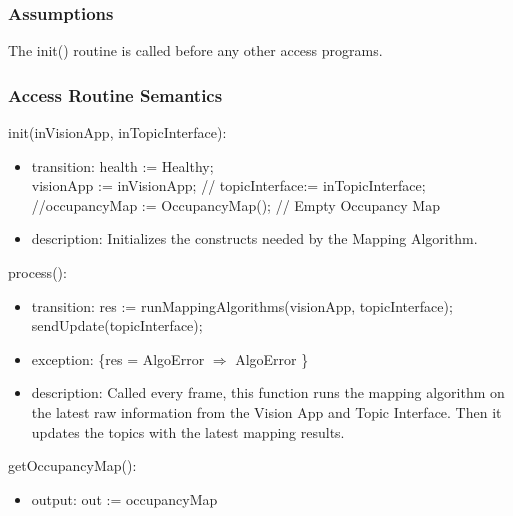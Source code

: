 \documentclass[12pt, titlepage]{article}
\begin{document}
\subsubsection{Assumptions}
The init() routine is called before any other access programs.
\subsubsection{Access Routine Semantics}
\noindent init(inVisionApp, inTopicInterface):
\begin{itemize}
\item transition: health := Healthy; \\ visionApp := inVisionApp; // topicInterface:= inTopicInterface; //occupancyMap := OccupancyMap(); // Empty Occupancy Map \\
\item description: Initializes the constructs needed by the Mapping Algorithm.
\end{itemize}
\noindent process():
\begin{itemize}
\item transition: res := runMappingAlgorithms(visionApp, topicInterface); \\
sendUpdate(topicInterface);
\item exception: \{res = AlgoError $\Rightarrow$ AlgoError \}
\item description: Called every frame, this function runs the mapping algorithm on the latest raw information from the Vision App and Topic Interface. Then it updates the topics with the latest mapping results.
\end{itemize}
\noindent getOccupancyMap():
\begin{itemize}
\item output: out := occupancyMap
\end{itemize}
\end{document}
